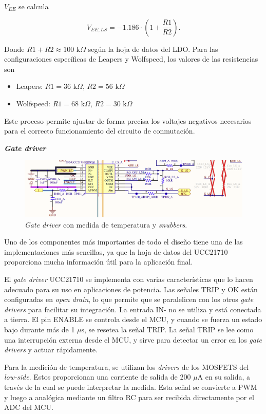 $V_{EE}$ se calcula 

\[ V_{EE,LS} = -1.186 \cdot \left(1 + \frac{R1}{R2}\right)  \text{.}\]

Donde \( R1 + R2 \approx 100 \text{ k}\Omega \) según la hoja de datos del LDO. Para las configuraciones específicas de Leapers y Wolfspeed, los valores de las resistencias son 

\begin{itemize}
	\item Leapers: \( R1 = 36 \text{ k}\Omega \), \( R2 = 56 \text{ k}\Omega \)
	\item Wolfspeed: \( R1 = 68 \text{ k}\Omega \), \( R2 = 30 \text{ k}\Omega \)
\end{itemize}

Este proceso permite ajustar de forma precisa los voltajes negativos necesarios para el correcto funcionamiento del circuito de conmutación.


\textbf{\textit{Gate driver}}
\begin{figure}[H]
	\centering
	\includegraphics[width=0.9\linewidth]{fig/GD-sch}
	\caption{\textit{Gate driver} con medida de temperatura y \textit{snubbers}.}
\end{figure}

Uno de los componentes más importantes de todo el diseño tiene una de las implementaciones más sencillas, ya que la hoja de datos del UCC21710 proporciona mucha información útil para la aplicación final.

El \textit{gate driver} UCC21710 se implementa con varias características que lo hacen adecuado para su uso en aplicaciones de potencia. Las señales TRIP y OK están configuradas en \textit{open drain}, lo que permite que se paralelicen con los otros \textit{gate drivers} para facilitar su integración. La entrada IN- no se utiliza y está conectada a tierra. El pin ENABLE se controla desde el MCU, y cuando se fuerza un estado bajo durante más de 1 $\mu$s, se resetea la señal TRIP. La señal TRIP se lee como una interrupción externa desde el MCU, y sirve para detectar un error en los \textit{gate drivers} y actuar rápidamente.

Para la medición de temperatura, se utilizan los \textit{drivers} de los MOSFETS del \textit{low-side}. Estos proporcionan una corriente de salida de 200 $\mu$A en su salida, a través de la cual se puede interpretar la medida. Esta señal se convierte a PWM y luego a analógica mediante un filtro RC para ser recibida directamente por el ADC del MCU. 

